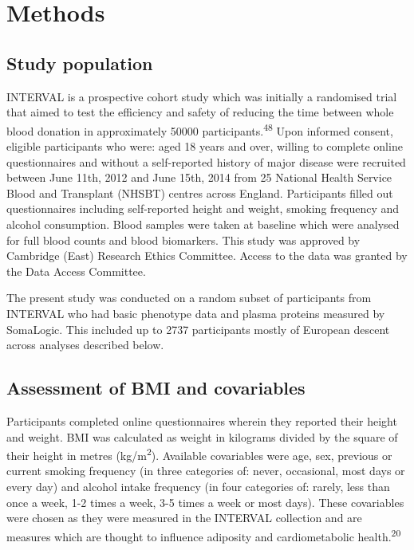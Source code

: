\documentclass[11pt,twoside]{bristolthesis}
\begin{document}
\hypertarget{methods-3}{%
\section{Methods}\label{methods-3}}

\hypertarget{study-population-2}{%
\subsection{Study population}\label{study-population-2}}

INTERVAL is a prospective cohort study which was initially a randomised trial that aimed to test the efficiency and safety of reducing the time between whole blood donation in approximately 50000 participants.\textsuperscript{48} Upon informed consent, eligible participants who were: aged 18 years and over, willing to complete online questionnaires and without a self-reported history of major disease were recruited between June 11th, 2012 and June 15th, 2014 from 25 National Health Service Blood and Transplant (NHSBT) centres across England. Participants filled out questionnaires including self-reported height and weight, smoking frequency and alcohol consumption. Blood samples were taken at baseline which were analysed for full blood counts and blood biomarkers. This study was approved by Cambridge (East) Research Ethics Committee. Access to the data was granted by the Data Access Committee.

The present study was conducted on a random subset of participants from INTERVAL who had basic phenotype data and plasma proteins measured by SomaLogic. This included up to 2737 participants mostly of European descent across analyses described below.

\hypertarget{assessment-of-bmi-and-covariables}{%
\subsection{Assessment of BMI and covariables}\label{assessment-of-bmi-and-covariables}}

Participants completed online questionnaires wherein they reported their height and weight. BMI was calculated as weight in kilograms divided by the square of their height in metres (kg/m\textsuperscript{2}). Available covariables were age, sex, previous or current smoking frequency (in three categories of: never, occasional, most days or every day) and alcohol intake frequency (in four categories of: rarely, less than once a week, 1-2 times a week, 3-5 times a week or most days). These covariables were chosen as they were measured in the INTERVAL collection and are measures which are thought to influence adiposity and cardiometabolic health.\textsuperscript{20}
\end{document}
